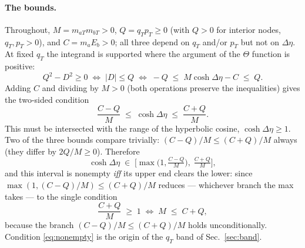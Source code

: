 \documentclass[11pt]{article}
\begin{document}
\paragraph{The bounds.}
Throughout, $M=m_{aT}m_{bT}>0$, $Q=q_Tp_T\ge0$ (with $Q>0$ for interior
nodes, $q_T,p_T>0$), and $C=m_aE_b>0$; all three depend on $q_T$ and/or
$p_T$ but not on $\Delta\eta$.  At fixed $q_T$ the integrand is supported
where the argument of the $\Theta$ function is positive:
\begin{equation}
Q^{2}-D^{2}\ge0
\;\iff\;
|D|\le Q
\;\iff\;
-Q\;\le\;M\cosh\Delta\eta-C\;\le\;Q .
\end{equation}
Adding $C$ and dividing by $M>0$ (both operations preserve the
inequalities) gives the two-sided condition
\begin{equation}
\frac{C-Q}{M}\;\le\;\cosh\Delta\eta\;\le\;\frac{C+Q}{M} .
\label{eq:coshwindow}
\end{equation}
This must be intersected with the range of the hyperbolic cosine,
$\cosh\Delta\eta\ge1$.  Two of the three bounds compare trivially:
$(C-Q)/M\le(C+Q)/M$ always (they differ by $2Q/M\ge0$).  Therefore
\begin{equation}
\cosh\Delta\eta\;\in\;
\Big[\max\!\Big(1,\tfrac{C-Q}{M}\Big),\;\tfrac{C+Q}{M}\Big],
\label{eq:coshset}
\end{equation}
and this interval is nonempty \emph{iff} its upper end clears the lower:
since $\max(1,(C-Q)/M)\le(C+Q)/M$ reduces --- whichever branch the max
takes --- to the single condition
\begin{equation}
\frac{C+Q}{M}\;\ge\;1
\;\iff\;
M\;\le\;C+Q ,
\label{eq:nonempty}
\end{equation}
because the branch $(C-Q)/M\le(C+Q)/M$ holds unconditionally.
Condition \eqref{eq:nonempty} is the origin of the $q_T$ band of
Sec.~\ref{sec:band}.
\end{document}
